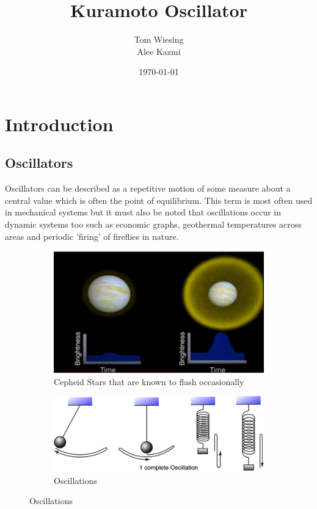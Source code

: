 \documentclass[12pt]{article}
\title{Kuramoto Oscillator}
\author{Tom Wiesing \\ Alee Kazmi}
\date{\today}
\begin{document}
	\maketitle
	\section{Introduction}	
	\subsection{Oscillators}
	Oscillators can be described as a repetitive motion of some measure about a central value which is often the point of equilibrium. This term is most often used in mechanical systems but it must also be noted that oscillations occur in dynamic systems too such as economic graphs, geothermal temperatures across areas and periodic 'firing' of fireflies in nature.
	\begin{figure}[h!]
		\centering
		\begin{subfigure}[h!]{0.3\textwidth}
			\includegraphics[width=\textwidth]{cepheid}
			\caption{Cepheid Stars that are known to flash occasionally}
			\label{fig:gull}
		\end{subfigure}
		\space\space\space
		\begin{subfigure}[h!]{0.5\textwidth}
			\includegraphics[width=\textwidth]{oscillation}
			\caption{Oscillations}
			\label{fig:gull}
		\end{subfigure}
	\end{figure}
	
\end{document}
